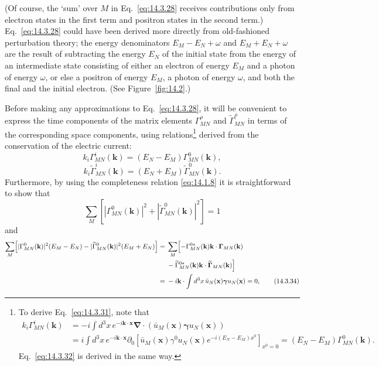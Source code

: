 (Of course, the `sum' over $M$ in Eq.~\eqref{eq:14.3.28} receives
contributions only from electron states in the first term and positron states
in the second term.) Eq.~\eqref{eq:14.3.28} could have been derived more
directly from old-fashioned perturbation theory; the energy denominators
$E_M-E_N+\omega$ and $E_M+E_N+\omega$ are the result of subtracting the energy
$E_N$ of the initial state from the energy of an intermediate state consisting
of either an electron of energy $E_M$ and a photon of energy $\omega$, or else
a positron of energy $E_M$, a photon of energy $\omega$, and both the final and
the initial electron. (See Figure~\ref{fig:14.2}.)



Before making any approximations to Eq.~\eqref{eq:14.3.28}, it will be
convenient to express the time components of the matrix elements
$\Gamma_{MN}^\rho$ and $\widetilde\Gamma_{MN}^\rho$ in terms of the
corresponding space components, using relations\footnote{To derive
Eq.~\eqref{eq:14.3.31}, note that
\begin{align*}
k_i\Gamma_{MN}^i(\mathbf k)
&=-i\int d^3x\,e^{-i\mathbf k\cdot\mathbf x}
\boldsymbol\nabla\cdot(\bar u_M(\mathbf x)\boldsymbol\gamma u_N(\mathbf x))\\
&=i\int d^3x\,e^{-i\mathbf k\cdot\mathbf x}
\partial_0\left[\bar u_M(\mathbf x)\gamma^0u_N(\mathbf x)
e^{-i(E_N-E_M)x^0}\right]_{x^0=0}
=(E_N-E_M)\Gamma_{MN}^0(\mathbf k).
\end{align*}
Eq.~\eqref{eq:14.3.32} is derived in the same way.} derived from the
conservation of the electric current:
\begin{equation}
k_i\Gamma_{MN}^i(\mathbf k)=(E_N-E_M)\Gamma_{MN}^0(\mathbf k),
\tag{14.3.31}\label{eq:14.3.31}
\end{equation}
\begin{equation}
k_i\widetilde\Gamma_{MN}^i(\mathbf k)
=(E_N+E_M)\widetilde\Gamma_{MN}^0(\mathbf k).
\tag{14.3.32}\label{eq:14.3.32}
\end{equation}
Furthermore, by using the completeness relation \eqref{eq:14.1.8} it is
straightforward to show that
\begin{equation}
\sum_M\left[|\Gamma_{MN}^0(\mathbf k)|^2
+|\widetilde\Gamma_{MN}^0(\mathbf k)|^2\right]=1
\tag{14.3.33}\label{eq:14.3.33}
\end{equation}
and
\begin{align}
\sum_M\Bigl[|\Gamma_{MN}^0(\mathbf k)|^2(E_M-E_N)
-|\widetilde\Gamma_{MN}^0(\mathbf k)|^2(E_M+E_N)\Bigr]
={}&\sum_M\Bigl[-\Gamma_{MN}^{0*}(\mathbf k)
\mathbf k\cdot\boldsymbol\Gamma_{MN}(\mathbf k)\notag\\
&-\widetilde\Gamma_{MN}^{0*}(\mathbf k)
\mathbf k\cdot\widetilde{\boldsymbol\Gamma}_{MN}(\mathbf k)\Bigr]
\notag\\
={}&-i\mathbf k\cdot\int d^3x\,\bar u_N(\mathbf x)
\boldsymbol\gamma u_N(\mathbf x)=0,
\tag{14.3.34}\label{eq:14.3.34}
\end{align}
